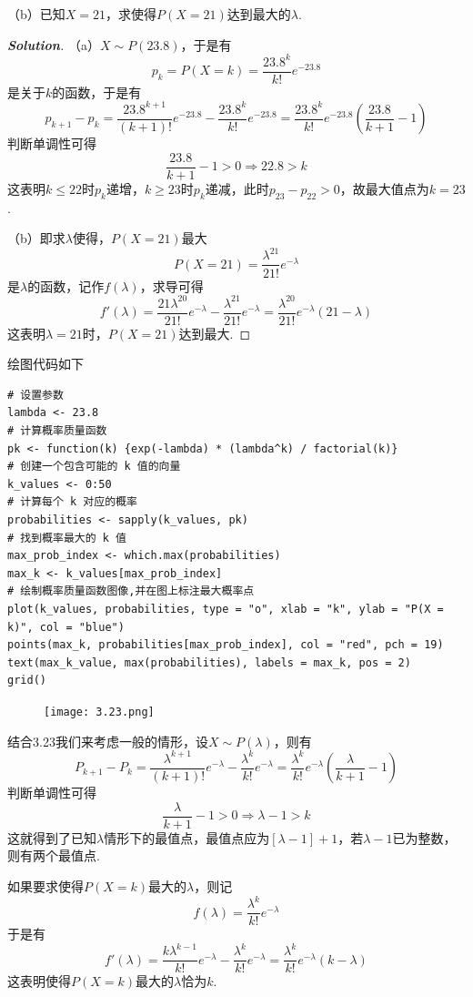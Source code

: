\documentclass[10pt, a4paper, oneside]{ctexart}
\newenvironment{solution}{\begin{proof}[\bf Solution]}{\end{proof}}
\begin{document}
（b）已知$X=21$，求使得$P(X=21)$达到最大的$\lambda$.
\begin{solution}

（a）$X\sim P(23.8)$，于是有
\[{p_k} = P(X = k) = \frac{{{{23.8}^k}}}{{k!}}{e^{ - 23.8}}\]
是关于$k$的函数，于是有
\[{p_{k + 1}} - {p_k} = \frac{{{{23.8}^{k + 1}}}}{{(k + 1)!}}{e^{ - 23.8}} - \frac{{{{23.8}^k}}}{{k!}}{e^{ - 23.8}} = \frac{{{{23.8}^k}}}{{k!}}{e^{ - 23.8}}\left( {\frac{{23.8}}{{k + 1}} - 1} \right)\]
判断单调性可得
\[\frac{{23.8}}{{k + 1}} - 1 > 0 \Rightarrow 22.8 > k\]
这表明$k\leqslant 22$时$p_k$递增，$k\geqslant 23$时$p_k$递减，此时$p_{23}-p_{22}>0$，故最大值点为$k=23$.

（b）即求$\lambda$使得，$P(X=21)$最大
\[P(X = 21) = \frac{{{\lambda ^{21}}}}{{21!}}{e^{ - \lambda }}\]
是$\lambda$的函数，记作$f(\lambda)$，求导可得
\[f'(\lambda ) = \frac{{21{\lambda ^{20}}}}{{21!}}{e^{ - \lambda }} - \frac{{{\lambda ^{21}}}}{{21!}}{e^{ - \lambda }} = \frac{{{\lambda ^{20}}}}{{21!}}{e^{ - \lambda }}\left( {21 - \lambda } \right)\]
这表明$\lambda=21$时，$P(X=21)$达到最大.
\end{solution}
绘图代码如下
\begin{lstlisting}
# 设置参数
lambda <- 23.8
# 计算概率质量函数
pk <- function(k) {exp(-lambda) * (lambda^k) / factorial(k)}
# 创建一个包含可能的 k 值的向量
k_values <- 0:50
# 计算每个 k 对应的概率
probabilities <- sapply(k_values, pk)
# 找到概率最大的 k 值
max_prob_index <- which.max(probabilities)
max_k <- k_values[max_prob_index]
# 绘制概率质量函数图像,并在图上标注最大概率点
plot(k_values, probabilities, type = "o", xlab = "k", ylab = "P(X = k)", col = "blue")
points(max_k, probabilities[max_prob_index], col = "red", pch = 19)
text(max_k_value, max(probabilities), labels = max_k, pos = 2)
grid()
\end{lstlisting}
\begin{figure}[H]
    \centering
    \texttt{[image: 3.23.png]}
\end{figure}
\begin{remark}
结合3.23我们来考虑一般的情形，设$X\sim P(\lambda)$，则有
\[{P_{k + 1}} - {P_k} = \frac{{{\lambda ^{k + 1}}}}{{(k + 1)!}}{e^{ - \lambda }} - \frac{{{\lambda ^k}}}{{k!}}{e^{ - \lambda }} = \frac{{{\lambda ^k}}}{{k!}}{e^{ - \lambda }}\left( {\frac{\lambda }{{k + 1}} - 1} \right)\]
判断单调性可得
\[\frac{\lambda }{{k + 1}} - 1 > 0 \Rightarrow \lambda  - 1 > k\]
这就得到了已知$\lambda$情形下的最值点，最值点应为$[\lambda - 1] + 1$，若$ \lambda - 1$已为整数，则有两个最值点.

如果要求使得$P(X=k)$最大的$\lambda$，则记
\[f(\lambda ) = \frac{{{\lambda ^k}}}{{k!}}{e^{ - \lambda }}\]
于是有
\[f'(\lambda ) = \frac{{k{\lambda ^{k - 1}}}}{{k!}}{e^{ - \lambda }} - \frac{{{\lambda ^k}}}{{k!}}{e^{ - \lambda }} = \frac{{{\lambda ^k}}}{{k!}}{e^{ - \lambda }}\left( {k - \lambda } \right)\]
这表明使得$P(X=k)$最大的$\lambda$恰为$k$.
\end{remark}
\end{document}
